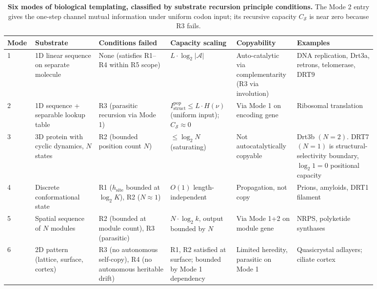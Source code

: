 \documentclass[aps,prx,reprint,amsmath,amssymb,floatfix,superscriptaddress,nofootinbib]{revtex4-2}
\theoremstyle{plain-thm}
\theoremstyle{definition-thm}
\newcommand{\Istructpop}{I_{\mathrm{struct}}^{\mathrm{pop}}}
\newcommand{\Csub}{C_{\mathcal{S}}}
\begin{document}
\begin{table}
\caption{\textbf{Six modes of biological templating, classified by substrate recursion principle conditions.} The Mode 2 entry gives the one-step channel mutual information under uniform codon input; its recursive capacity $\Csub$ is near zero because R3 fails.}
\label{tab:modes}
\begin{tabular}{p{0.05\linewidth} p{0.16\linewidth} p{0.18\linewidth} p{0.16\linewidth} p{0.13\linewidth} p{0.20\linewidth}}
\toprule
Mode & Substrate & Conditions failed & Capacity scaling & Copyability & Examples \\
\midrule
1 & 1D linear sequence on separate molecule & None (satisfies R1--R4 within R5 scope) & $L \cdot \log_2 |\mathcal{A}|$ & Auto-catalytic via complementarity (R3 via involution) & DNA replication, Drt3a, retrons, telomerase, DRT9 \\
2 & 1D sequence + separable lookup table & R3 (parasitic recursion via Mode 1) & $\Istructpop \le L \cdot H(\nu)$ (uniform input); $\Csub \approx 0$ & Via Mode 1 on encoding gene & Ribosomal translation \\
3 & 3D protein with cyclic dynamics, $N$ states & R2 (bounded position count $N$) & $\le \log_2 N$ (saturating) & Not autocatalytically copyable & Drt3b $(N=2)$. DRT7 $(N=1)$ is structural-selectivity boundary, $\log_2 1 = 0$ positional capacity \\
4 & Discrete conformational state & R1 ($h_{\mathrm{site}}$ bounded at $\log_2 K$), R2 ($N \approx 1$) & $O(1)$ length-independent & Propagation, not copy & Prions, amyloids, DRT1 filament \\
5 & Spatial sequence of $N$ modules & R2 (bounded at module count), R3 (parasitic) & $N \cdot \log_2 k$, output bounded by $N$ & Via Mode 1+2 on module gene & NRPS, polyketide synthases \\
6 & 2D pattern (lattice, surface, cortex) & R3 (no autonomous self-copy), R4 (no autonomous heritable drift) & R1, R2 satisfied at surface; bounded by Mode 1 dependency & Limited heredity, parasitic on Mode 1 & Quasicrystal adlayers; ciliate cortex \\
\bottomrule
\end{tabular}
\end{table}
\end{document}

